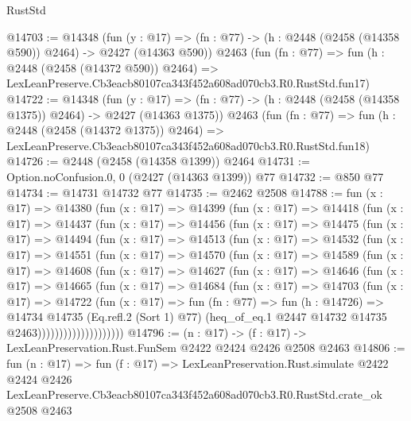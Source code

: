 \begin{lexlean}{RustStd}
\begin{coremodule}
@14703 := @14348
    (fun (y : @17) => (fn : @77) -> (h : @2448 (@2458 (@14358 @590)) @2464) -> @2427 (@14363 @590))
    @2463
    (fun (fn : @77) =>
    fun (h : @2448 (@2458 (@14372 @590)) @2464) =>
    LexLeanPreserve.Cb3eacb80107ca343f452a608ad070cb3.R0.RustStd.fun17)
@14722 := @14348
    (fun (y : @17) =>
    (fn : @77) -> (h : @2448 (@2458 (@14358 @1375)) @2464) -> @2427 (@14363 @1375))
    @2463
    (fun (fn : @77) =>
    fun (h : @2448 (@2458 (@14372 @1375)) @2464) =>
    LexLeanPreserve.Cb3eacb80107ca343f452a608ad070cb3.R0.RustStd.fun18)
@14726 := @2448 (@2458 (@14358 @1399)) @2464
@14731 := Option.noConfusion.{0, 0} (@2427 (@14363 @1399)) @77
@14732 := @850 @77
@14734 := @14731 @14732 @77
@14735 := @2462 @2508
@14788 := fun (x : @17) =>
  @14380
    (fun (x : @17) =>
    @14399
      (fun (x : @17) =>
      @14418
        (fun (x : @17) =>
        @14437
          (fun (x : @17) =>
          @14456
            (fun (x : @17) =>
            @14475
              (fun (x : @17) =>
              @14494
                (fun (x : @17) =>
                @14513
                  (fun (x : @17) =>
                  @14532
                    (fun (x : @17) =>
                    @14551
                      (fun (x : @17) =>
                      @14570
                        (fun (x : @17) =>
                        @14589
                          (fun (x : @17) =>
                          @14608
                            (fun (x : @17) =>
                            @14627
                              (fun (x : @17) =>
                              @14646
                                (fun (x : @17) =>
                                @14665
                                  (fun (x : @17) =>
                                  @14684
                                    (fun (x : @17) =>
                                    @14703
                                      (fun (x : @17) =>
                                      @14722
                                        (fun (x : @17) =>
                                        fun (fn : @77) =>
                                        fun (h : @14726) =>
                                        @14734
                                          @14735
                                          (Eq.refl.{2} (Sort 1) @77)
                                          (heq_of_eq.{1}
                                            @2447
                                            @14732
                                            @14735
                                            @2463))))))))))))))))))))
@14796 := (n : @17) -> (f : @17) -> LexLeanPreservation.Rust.FunSem @2422 @2424 @2426 @2508 @2463
@14806 := fun (n : @17) =>
  fun (f : @17) =>
  LexLeanPreservation.Rust.simulate
    @2422
    @2424
    @2426
    LexLeanPreserve.Cb3eacb80107ca343f452a608ad070cb3.R0.RustStd.crate_ok
    @2508
    @2463
\end{coremodule}
\end{lexlean}
